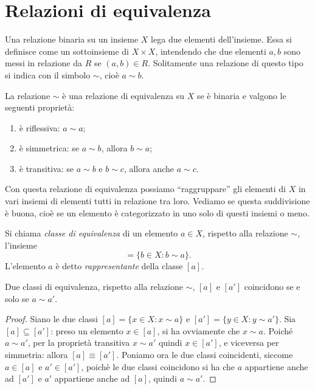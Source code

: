 \section{Relazioni di equivalenza} \label{sec:relazioni-equivalenza}
Una relazione binaria su un insieme $X$ lega due elementi dell'insieme.
Essa si definisce come un sottoinsieme di $X\times X$, intendendo che due elementi $a,b$ sono messi in relazione da $R$ se $(a,b)\in R$.
Solitamente una relazione di questo tipo si indica con il simbolo $\sim$, cioè $a\sim b$.
\begin{definizione}
	La relazione $\sim$ è una relazione di equivalenza su $X$ se è binaria e valgono le seguenti proprietà:
	\begin{enumerate}
		\item è riflessiva: $a\sim a$;
		\item è simmetrica: se $a\sim b$, allora $b\sim a$;
		\item è transitiva: se $a\sim b$ e $b\sim c$, allora anche $a\sim c$.
	\end{enumerate}
\end{definizione}
Con questa relazione di equivalenza possiamo ``raggruppare'' gli elementi di $X$ in vari insiemi di elementi tutti in relazione tra loro.
Vediamo se questa suddivisione è buona, cioè se un elemento è categorizzato in uno solo di questi insiemi o meno.
\begin{definizione}
	Si chiama \emph{classe di equivalenza} di un elemento $a\in X$, rispetto alla relazione $\sim$, l'insieme
	\begin{equation*}
		[a]=\{b\in X\colon b\sim a\}.
	\end{equation*}
	L'elemento $a$ è detto \emph{rappresentante} della classe $[a]$.
\end{definizione}
\begin{teorema}
	Due classi di equivalenza, rispetto alla relazione $\sim$, $[a]$ e $[a']$ coincidono se e solo se $a\sim a'$.
\end{teorema}
\begin{proof}
	Siano le due classi $[a]=\{x\in X\colon x\sim a\}$ e $[a']=\{y\in X\colon y\sim a'\}$.
	Sia $[a]\subseteq[a']$: preso un elemento $x\in[a]$, si ha ovviamente che $x\sim a$.
	Poiché $a\sim a'$, per la proprietà transitiva $x\sim a'$ quindi $x\in[a']$, e viceversa per simmetria: allora $[a]\equiv[a']$.
	Poniamo ora le due classi coincidenti, siccome $a\in[a]$ e $a'\in[a']$, poichè le due classi coincidono si ha che $a$ appartiene anche ad $[a']$ e $a'$ appartiene anche ad $[a]$, quindi $a\sim a'$.
\end{proof}

